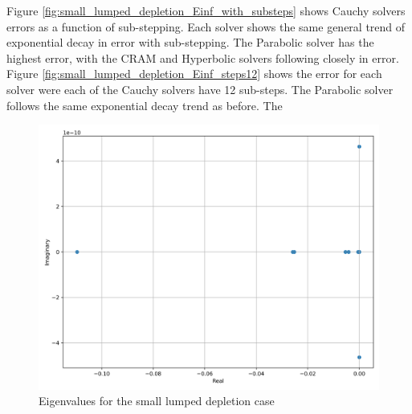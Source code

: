 Figure \ref{fig:small_lumped_depletion_Einf_with_substeps} shows Cauchy solvers errors as a function of sub-stepping. Each solver shows the same general trend of exponential decay in error with sub-stepping. The Parabolic solver has the highest error, with the CRAM and Hyperbolic solvers following closely in error. Figure \ref{fig:small_lumped_depletion_Einf_steps12} shows the error for each solver were each of the Cauchy solvers have 12 sub-steps. The Parabolic solver follows the same exponential decay trend as before. The 

\clearpage

\begin{figure}[p]
    \centering
    \includegraphics[width=5in]{images/chapter-5/caseStudies/smallLumpedDepletion/msrLumpedDepletionSmallEigenvalues.png}
    \caption{Eigenvalues for the small lumped depletion case}
    \label{fig:small_lumped_depletion_eigenvalues}
\end{figure}

\clearpage

